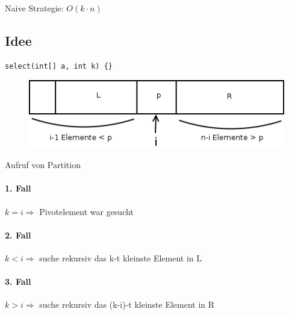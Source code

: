 Naive Strategie: $O(k \cdot n)$


\subsection*{Idee} 

\begin{lstlisting}
select(int[] a, int k) {}
\end{lstlisting}

\begin{figure}
\vspace{-25pt}
\includegraphics[width=\linewidth]{06/Grafik/img5.png}
\caption{}
\end{figure}

\vspace{30pt}
Aufruf von Partition
\vspace{90pt}

\paragraph{1. Fall} $k=i \Rightarrow$ Pivotelement war gesucht
\paragraph{2. Fall} $k<i \Rightarrow$ suche rekursiv das k-t kleinste Element in L 
\paragraph{3. Fall} $k>i \Rightarrow$ suche rekursiv das (k-i)-t kleinste Element in R

